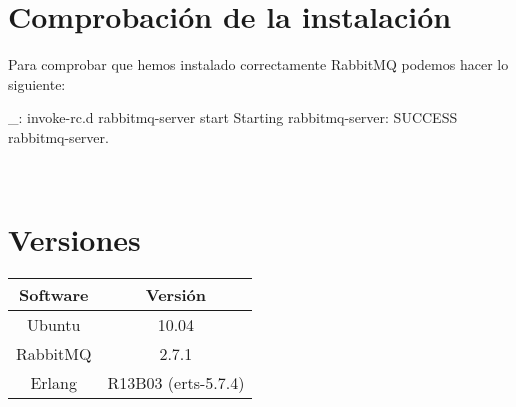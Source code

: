 \section{Comprobación de la instalación}

Para comprobar que hemos instalado correctamente RabbitMQ podemos hacer lo siguiente:

\begin{bashcode}
_: invoke-rc.d rabbitmq-server start
Starting rabbitmq-server: SUCCESS
rabbitmq-server.
\end{bashcode}
\\


\section{Versiones}

\begin{tabular}{|c|c|}
   \hline
   Software & Versión \\ \hline
   Ubuntu & 10.04 \\ \hline
   RabbitMQ & 2.7.1 \\ \hline
   Erlang & R13B03 (erts-5.7.4) \\ \hline
\end{tabular}
